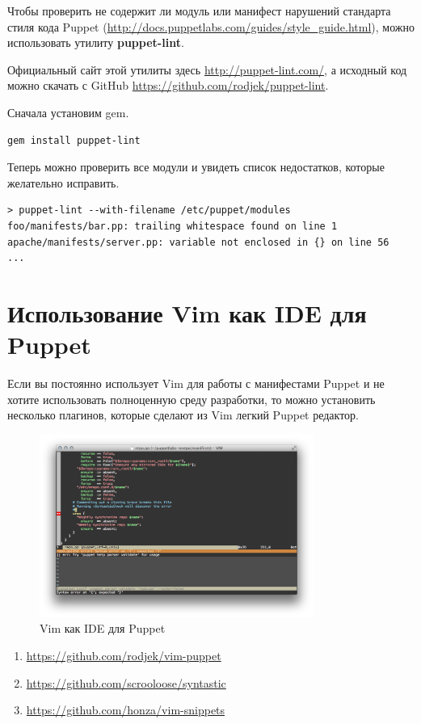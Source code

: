 Чтобы проверить не содержит ли модуль или манифест нарушений стандарта стиля кода Puppet (\url{http://docs.puppetlabs.com/guides/style_guide.html}), можно использовать утилиту \textbf{puppet-lint}.

Официальный сайт этой утилиты здесь \url{http://puppet-lint.com/}, а исходный код можно скачать с GitHub \url{https://github.com/rodjek/puppet-lint}.

Сначала установим gem.

\begin{verbatim}
gem install puppet-lint
\end{verbatim}

Теперь можно проверить все модули и увидеть список недостатков, которые желательно исправить.

\begin{verbatim}
> puppet-lint --with-filename /etc/puppet/modules
foo/manifests/bar.pp: trailing whitespace found on line 1
apache/manifests/server.pp: variable not enclosed in {} on line 56
...
\end{verbatim}

\section{Использование Vim как IDE для Puppet}

Если вы постоянно использует Vim для работы с манифестами Puppet и не хотите использовать полноценную среду разработки, то можно установить несколько плагинов, которые сделают из Vim легкий Puppet редактор.

\begin{figure}[h]
\centering
\includegraphics[width=0.8\textwidth]{img/syntastic.png}
\caption{Vim как IDE для Puppet}
\label{fig:syntastic}
\end{figure}

\begin{enumerate}
\item \url{https://github.com/rodjek/vim-puppet}
\item \url{https://github.com/scrooloose/syntastic}
\item \url{https://github.com/honza/vim-snippets}
\end{enumerate}

